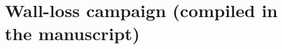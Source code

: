 \documentclass[11pt]{article}
\begin{document}
\section{Wall-loss campaign (compiled in the manuscript)}\label{sec:wall-loss-v4}

\end{document}
